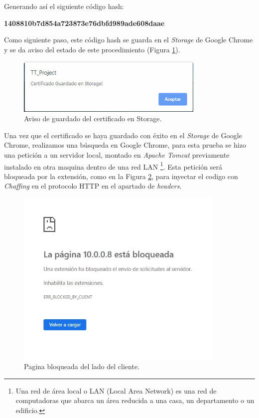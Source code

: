 \documentclass[12pt, a4paper, titlepage]{report}
\begin{document}
	        Generando así el siguiente código hash:
        	\begin{center}
        	   \textbf{1408810b7d854a723873e76dbfd989ade608daae}
        	\end{center}
        	Como siguiente paso, este código hash se guarda en el \textit{Storage} de Google Chrome y se da aviso del estado de este procedimiento (Figura \ref{fig:certGuardadoStorage}).
	
        	\begin{figure}[H]
        		\begin{center}	\includegraphics[width=9cm]{./imagenes/Desarrollo/Componente_1/Version1/certificadoStorage.PNG}
        			\caption{Aviso de guardado del certificado en Storage.}
                    \label{fig:certGuardadoStorage}
        		\end{center}
        	\end{figure}
	
        	Una vez que el certificado se haya guardado con éxito en el \textit{Storage} de Google Chrome, realizamos una búsqueda en Google Chrome, para esta prueba se hizo una petición a un servidor local, montado en \textit{Apache Tomcat} previamente instalado en otra maquina dentro de una red LAN \footnote{Una red de área local o LAN (Local Area Network) es una red de computadoras que abarca un área reducida a una casa, un departamento o un edificio.}. Esta petición será bloqueada por la extensión, como en la Figura \ref{fig:paginaBloqueada}, para inyectar el codigo con \textit{Chaffing} en el protocolo HTTP en el apartado de \textit{headers}.
	
            \begin{figure}[H]
        		\begin{center}	\includegraphics[width=10cm]{./imagenes/Desarrollo/Componente_1/Version1/pageBlocked.jpeg}
        			\caption{Pagina bloqueada del lado del cliente.}
        		    \label{fig:paginaBloqueada}
        		\end{center}
        	\end{figure}
    
\end{document}
